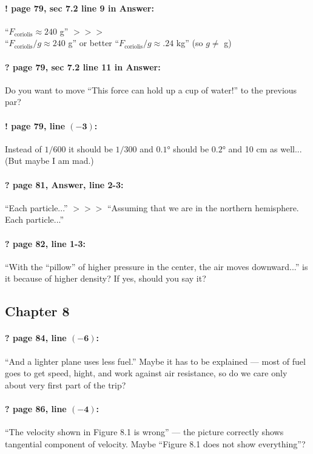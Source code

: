 \documentclass[twoside]{article}
\begin{document}
\paragraph{! page 79, sec 7.2 line 9 in Answer:}
``$F_{\mathrm{coriolis}}\approx 240$ g'' $>\!>\!>$
\\
``$F_{\mathrm{coriolis}}/g\approx 240$ g'' or better ``$F_{\mathrm{coriolis}}/g\approx .24$ kg'' (so $g\ne$ g)

\paragraph{? page 79, sec 7.2 line 11 in Answer:} Do you want to move ``This force can hold up a cup of water!'' to the previous par?

\paragraph{! page 79, line $\bm{(-3)}$:} Instead of $1/600$ it should be $1/300$ and $0{.}1$° should be $0{.}2$° and 10 cm as well... (But maybe I am mad.)

\paragraph{? page 81, Answer, line 2-3:} ``Each particle...'' $>\!>\!>$ ``Assuming that we are in the northern hemisphere. Each particle...''

\paragraph{? page 82, line 1-3:} ``With the
“pillow” of higher pressure in the center, the air moves
downward...'' is it because of higher density? If yes, should you say it?

\subsection*{Chapter 8}

\paragraph{? page 84, line $\bm{(-6)}$:} ``And a lighter plane uses less fuel.'' Maybe it has to be explained --- most of fuel goes to get speed, hight, and work against air resistance, so do we care only about very first part of the trip?

\paragraph{? page 86, line $\bm{(-4)}$:} ``The velocity shown in Figure 8.1 is wrong'' --- the picture correctly shows tangential component of velocity. Maybe ``Figure 8.1 does not show everything''?
\end{document}
